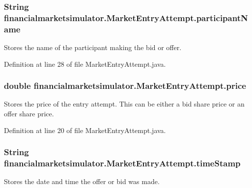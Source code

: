 \hypertarget{classfinancialmarketsimulator_1_1_market_entry_attempt_a3b4418b6906b72597b72ec50a245afce}{
\subsubsection[{participant\+Name}]{\setlength{\rightskip}{0pt plus 5cm}String financialmarketsimulator.\+Market\+Entry\+Attempt.\+participant\+Name\hspace{0.3cm}{\ttfamily [protected]}}}\label{classfinancialmarketsimulator_1_1_market_entry_attempt_a3b4418b6906b72597b72ec50a245afce}
Stores the name of the participant making the bid or offer. 

Definition at line 28 of file Market\+Entry\+Attempt.\+java.

\hypertarget{classfinancialmarketsimulator_1_1_market_entry_attempt_a6e3074ceef1578108b239a355b0a6747}{
\subsubsection[{price}]{\setlength{\rightskip}{0pt plus 5cm}double financialmarketsimulator.\+Market\+Entry\+Attempt.\+price\hspace{0.3cm}{\ttfamily [protected]}}}\label{classfinancialmarketsimulator_1_1_market_entry_attempt_a6e3074ceef1578108b239a355b0a6747}
Stores the price of the entry attempt. This can be either a bid share price or an offer share price. 

Definition at line 20 of file Market\+Entry\+Attempt.\+java.

\hypertarget{classfinancialmarketsimulator_1_1_market_entry_attempt_acd62492a481b9db42703ce1c60a01ff3}{
\subsubsection[{time\+Stamp}]{\setlength{\rightskip}{0pt plus 5cm}String financialmarketsimulator.\+Market\+Entry\+Attempt.\+time\+Stamp\hspace{0.3cm}{\ttfamily [protected]}}}\label{classfinancialmarketsimulator_1_1_market_entry_attempt_acd62492a481b9db42703ce1c60a01ff3}
Stores the date and time the offer or bid was made. 

